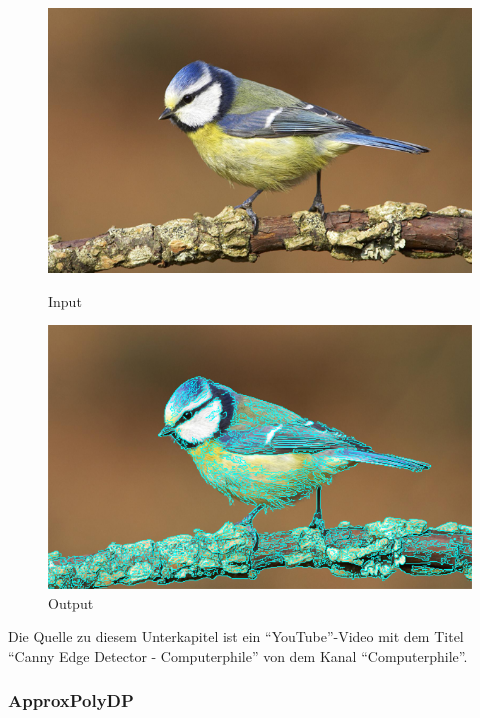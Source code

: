\begin{figure}[htb]
  \centering
  \begin{minipage}[t]{0.45\linewidth}
    \centering
    \includegraphics[width=\linewidth]{pics/bildverarbeitungsalgos/input.png}
    \caption{Input \cite{maai:input:cite}}
    \label{maai:getcounturs:input}
  \end{minipage}
  \hfill
  \begin{minipage}[t]{0.45\linewidth}
    \centering
    \includegraphics[width=\linewidth]{pics/bildverarbeitungsalgos/getcounturs_output.png}
    \caption{Output}
    \label{maai:getcounturs:output}
  \end{minipage}
\end{figure}

Die Quelle zu diesem Unterkapitel ist ein ``YouTube''-Video mit dem Titel ``Canny Edge Detector - Computerphile'' von dem Kanal ``Computerphile''. \cite{cannyedge:cite}

\subsubsection{ApproxPolyDP}\label{maai:approxpolydp:header}

